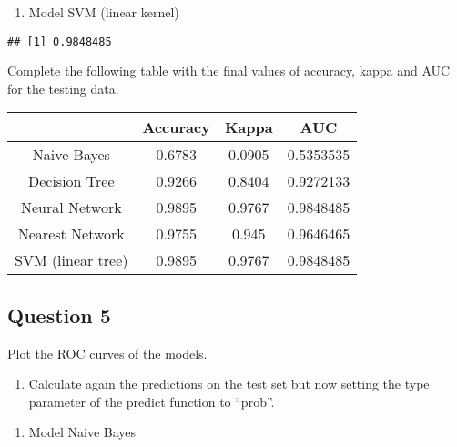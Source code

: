 \documentclass[]{article}
\newenvironment{Shaded}{\begin{snugshade}}{\end{snugshade}}
\newcommand{\KeywordTok}[1]{\textcolor[rgb]{0.13,0.29,0.53}{\textbf{#1}}}
\newcommand{\NormalTok}[1]{#1}
\newcommand{\OperatorTok}[1]{\textcolor[rgb]{0.81,0.36,0.00}{\textbf{#1}}}
\providecommand{\tightlist}{%
  \setlength{\itemsep}{0pt}\setlength{\parskip}{0pt}}
\begin{document}
\begin{enumerate}
\def\labelenumi{\arabic{enumi}.}
\setcounter{enumi}{4}
\tightlist
\item
  Model SVM (linear kernel)
\end{enumerate}

\begin{Shaded}
\end{Shaded}

\begin{verbatim}
## [1] 0.9848485
\end{verbatim}

Complete the following table with the final values of accuracy, kappa
and AUC for the testing data.

\begin{center}
	\begin{tabular}{ |c|c|c|c| } 
		\hline
		& Accuracy & Kappa & AUC \\
		\hline
		Naive Bayes & 0.6783 & 0.0905 & 0.5353535 \\ 
		Decision Tree & 0.9266 & 0.8404 & 0.9272133 \\ 
		Neural Network & 0.9895 & 0.9767 & 0.9848485 \\ 
		Nearest Network & 0.9755 & 0.945 & 0.9646465 \\ 
		SVM (linear tree) & 0.9895 & 0.9767 & 0.9848485 \\ 
		\hline
	\end{tabular}
\end{center}

\hypertarget{question-5}{%
\subsection{Question 5}\label{question-5}}

Plot the ROC curves of the models.

\begin{enumerate}
\def\labelenumi{\alph{enumi})}
\tightlist
\item
  Calculate again the predictions on the test set but now setting the
  type parameter of the predict function to ``prob''.
\end{enumerate}

\begin{enumerate}
\def\labelenumi{\arabic{enumi}.}
\tightlist
\item
  Model Naive Bayes
\end{enumerate}
\end{document}
